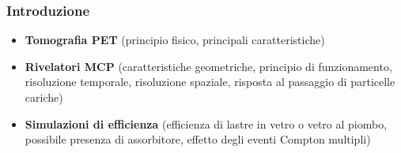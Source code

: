 \linespread{1.5}
\begin{frame}
\frametitle{Introduzione}

\begin{itemize}

	\item	\textbf{Tomografia PET} (principio fisico, principali caratteristiche)
\\
	\item	\textbf{Rivelatori MCP} (caratteristiche geometriche, principio di funzionamento, risoluzione temporale, risoluzione spaziale, risposta al passaggio di particelle cariche)
\\
	\item \textbf{Simulazioni di efficienza} (efficienza di lastre in vetro o vetro al piombo, possibile presenza di assorbitore, effetto degli eventi Compton multipli)
\end{itemize}



\end{frame}